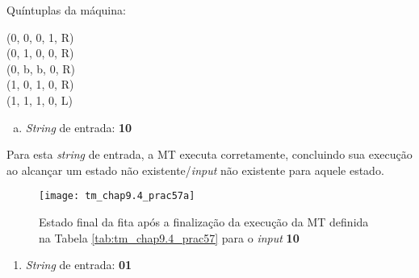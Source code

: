 \begin{table}[H]
    \begin{minipage}{.5\linewidth}
        \begin{flushright}
            Quíntuplas da máquina:\hspace*{1ex}    %
        \end{flushright}
    \end{minipage}%
    \begin{minipage}{.5\linewidth}
            \ttfamily
            \hspace*{1ex}(0, 0, 0, 1, R) \\        %
            \hspace*{1ex}(0, 1, 0, 0, R) \\        %
            \hspace*{1ex}(0, b, b, 0, R) \\        %
            \hspace*{1ex}(1, 0, 1, 0, R) \\        %
            \hspace*{1ex}(1, 1, 1, 0, L)           %
    \end{minipage}

    \caption{\cite[p.\ 764, Practice 57]{judith}}
    \label{tab:tm_chap9.4_prac57}
\end{table}

\begin{enumerate}[a.]
    \item \textit{String} de entrada: \textbf{10}
\end{enumerate}

Para esta \textit{string} de entrada, a MT executa corretamente, concluindo sua
execução ao alcançar um estado não existente/\textit{input} não existente para
aquele estado.

\begin{figure}[H]
    \centering
    \texttt{[image: tm\_chap9.4\_prac57a]}
    \caption{
        Estado final da fita após a finalização da execução da MT definida na
        Tabela \ref{tab:tm_chap9.4_prac57} para o \textit{input} \textbf{10}
    }
    \label{fig:tm_chap9.4_prac57a}
\end{figure}

\begin{enumerate}[resume*]
    \item \textit{String} de entrada: \textbf{01}
\end{enumerate}

